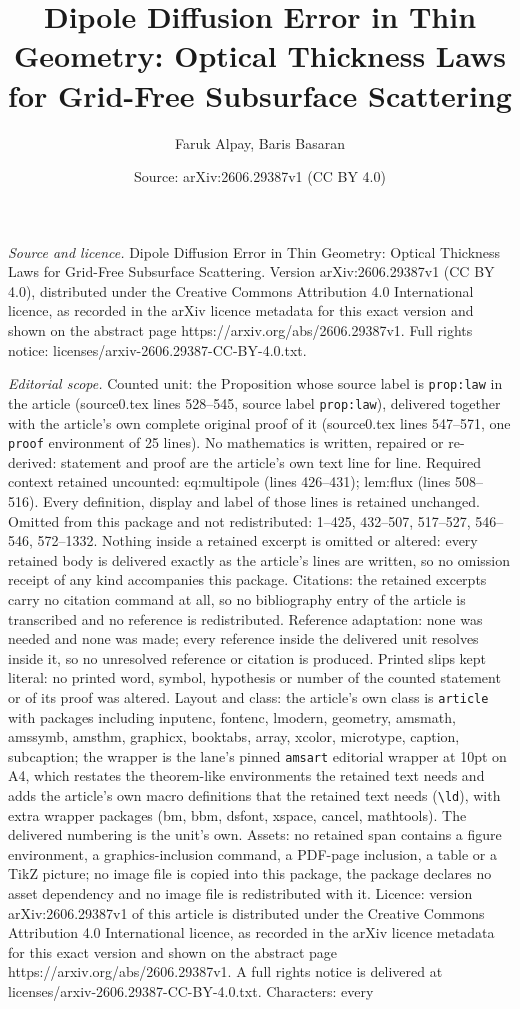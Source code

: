 \documentclass[10pt,a4paper]{amsart}
\title[Dipole Diffusion Error in Thin Geometry: Optical Thickness L]{Dipole Diffusion Error in Thin Geometry: Optical Thickness Laws for Grid-Free Subsurface Scattering}
\author{Faruk Alpay, Baris Basaran}
\date{Source: arXiv:2606.29387v1 (CC BY 4.0)}
\begin{document}
\maketitle

\noindent\emph{Source and licence.} Dipole Diffusion Error in Thin Geometry: Optical Thickness Laws for Grid-Free Subsurface Scattering. Version arXiv:2606.29387v1 (CC BY 4.0), distributed under the Creative Commons Attribution 4.0 International licence, as recorded in the arXiv licence metadata for this exact version and shown on the abstract page https://arxiv.org/abs/2606.29387v1. Full rights notice: licenses/arxiv-2606.29387-CC-BY-4.0.txt.\par\smallskip

\noindent\textit{Editorial scope.} Counted unit: the Proposition whose source label is \texttt{prop:law} in the article (source0.tex lines 528--545, source label \texttt{prop:law}), delivered together with the article's own complete original proof of it (source0.tex lines 547--571, one \texttt{proof} environment of 25 lines). No mathematics is written, repaired or re-derived: statement and proof are the article's own text line for line. Required context retained uncounted: eq:multipole (lines 426--431); lem:flux (lines 508--516). Every definition, display and label of those lines is retained unchanged. Omitted from this package and not redistributed: 1--425, 432--507, 517--527, 546--546, 572--1332. Nothing inside a retained excerpt is omitted or altered: every retained body is delivered exactly as the article's lines are written, so no omission receipt of any kind accompanies this package. Citations: the retained excerpts carry no citation command at all, so no bibliography entry of the article is transcribed and no reference is redistributed. Reference adaptation: none was needed and none was made; every reference inside the delivered unit resolves inside it, so no unresolved reference or citation is produced. Printed slips kept literal: no printed word, symbol, hypothesis or number of the counted statement or of its proof was altered. Layout and class: the article's own class is \texttt{article} with packages including inputenc, fontenc, lmodern, geometry, amsmath, amssymb, amsthm, graphicx, booktabs, array, xcolor, microtype, caption, subcaption; the wrapper is the lane's pinned \texttt{amsart} editorial wrapper at 10pt on A4, which restates the theorem-like environments the retained text needs and adds the article's own macro definitions that the retained text needs (\texttt{\textbackslash ld}), with extra wrapper packages (bm, bbm, dsfont, xspace, cancel, mathtools). The delivered numbering is the unit's own. Assets: no retained span contains a figure environment, a graphics-inclusion command, a PDF-page inclusion, a table or a TikZ picture; no image file is copied into this package, the package declares no asset dependency and no image file is redistributed with it. Licence: version arXiv:2606.29387v1 of this article is distributed under the Creative Commons Attribution 4.0 International licence, as recorded in the arXiv licence metadata for this exact version and shown on the abstract page https://arxiv.org/abs/2606.29387v1. A full rights notice is delivered at licenses/arxiv-2606.29387-CC-BY-4.0.txt. Characters: every 
\end{document}
